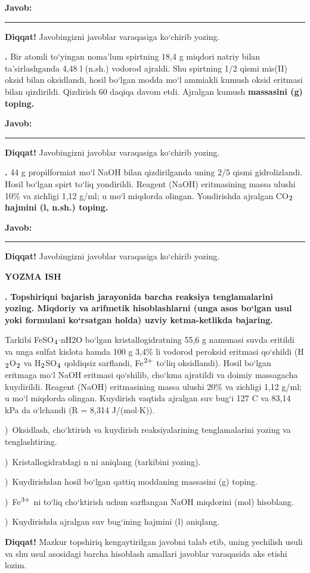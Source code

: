 \documentclass[11pt,a4paper]{article}
\renewcommand{\textsubscript}[1]{\ensuremath{_{\text{\fontsize{8}{8}\selectfont #1}}}}
\renewcommand{\textsuperscript}[1]{\ensuremath{^{\text{\fontsize{8}{8}\selectfont #1}}}}
\newcommand{\qn}[1]{\textbf{\fontsize{11.5}{13}\selectfont #1}}
\newcommand{\qsep}{\par\vspace{13pt}}
\newcommand{\diqqat}[1]{\par\smallskip\noindent\textbf{Diqqat!} #1\par\medskip}
\newcommand{\javob}{\par\nopagebreak[4]\smallskip\noindent\textbf{Javob:} \rule[-2pt]{7.5cm}{0.4pt}\par\smallskip\noindent\textbf{Diqqat!} Javobingizni javoblar varaqasiga ko`chirib yozing.\par\medskip}
\begin{document}
\javob\qsep
\noindent\qn{39.} Bir atomli to`yingan noma'lum spirtning 18,4 g miqdori natriy bilan ta'sirlashganda 4,48 l (n.sh.) vodorod ajraldi. Shu spirtning 1/2 qismi mis(II) oksid bilan oksidlandi, hosil bo`lgan modda mo`l ammiakli kumush oksid eritmasi bilan qizdirildi. Qizdirish 60 daqiqa davom etdi. Ajralgan kumush \textbf{massasini (g) toping.}
\javob\qsep
\noindent\qn{40.} 44 g propilformiat mo`l NaOH bilan qizdirilganda uning 2/5 qismi gidrolizlandi. Hosil bo`lgan spirt to`liq yondirildi. Reagent (NaOH) eritmasining massa ulushi 10\% va zichligi 1,12 g/ml; u mo`l miqdorda olingan. Yondirishda ajralgan CO\textsubscript{2} \textbf{hajmini (l, n.sh.) toping.}
\javob\qsep
\par\bigskip\begin{center}\textbf{\fontsize{13}{15}\selectfont YOZMA ISH}\end{center}
\noindent\qn{41.} \textbf{Topshiriqni bajarish jarayonida barcha reaksiya tenglamalarini yozing. Miqdoriy va arifmetik hisoblashlarni (unga asos bo`lgan usul yoki formulani ko`rsatgan holda) uzviy ketma-ketlikda bajaring.}\par\smallskip
Tarkibi FeSO\textsubscript{4}$\cdot$nH2O bo`lgan kristallogidratning 55,6 g namunasi suvda eritildi va unga sulfat kislota hamda 100 g 3,4\% li vodorod peroksid eritmasi qo`shildi (H\textsubscript{2}O\textsubscript{2} va H\textsubscript{2}SO\textsubscript{4} qoldiqsiz sarflandi, Fe\textsuperscript{2+} to`liq oksidlandi). Hosil bo`lgan eritmaga mo`l NaOH eritmasi qo`shilib, cho`kma ajratildi va doimiy massagacha kuydirildi. Reagent (NaOH) eritmasining massa ulushi 20\% va zichligi 1,12 g/ml; u mo`l miqdorda olingan. Kuydirish vaqtida ajralgan suv bug`i 127 \textdegree{}C va 83,14 kPa da o`lchandi (R = 8,314 J/(mol$\cdot$K)).\par
{})\ Oksidlash, cho`ktirish va kuydirish reaksiyalarining tenglamalarini yozing va tenglashtiring.\par
{})\ Kristallogidratdagi n ni aniqlang (tarkibini yozing).\par
{})\ Kuydirishdan hosil bo`lgan qattiq moddaning massasini (g) toping.\par
{})\ Fe\textsuperscript{3+} ni to`liq cho`ktirish uchun sarflangan NaOH miqdorini (mol) hisoblang.\par
{})\ Kuydirishda ajralgan suv bug`ining hajmini (l) aniqlang.\par
\diqqat{Mazkur topshiriq kengaytirilgan javobni talab etib, uning yechilish usuli va shu usul asosidagi barcha hisoblash amallari javoblar varaqasida aks etishi lozim.}\qsep
\end{document}
